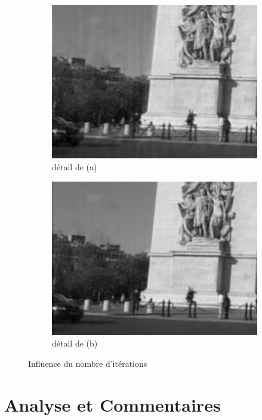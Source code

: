 \documentclass[a4paper,10pt]{report}
\begin{document}
\begin{figure}[h]
\begin{subfigure}{0.5\textwidth}
    \includegraphics[width=0.99\linewidth]{ressource/detail_1000iter.png} 
    \caption{détail de (a)}
    \label{fig:detail1000iter}
  \end{subfigure}
  \begin{subfigure}{0.5\textwidth}
    \includegraphics[width=0.99\linewidth]{ressource/detail_2000iter.png} 
    \caption{détail de (b)}
    \label{fig:detail2000iter}
  \end{subfigure}
  
  \caption{Influence du nombre d'itérations}
  \label{fig:nb_iter}
\end{figure}

\section{Analyse et Commentaires}
\end{document}
